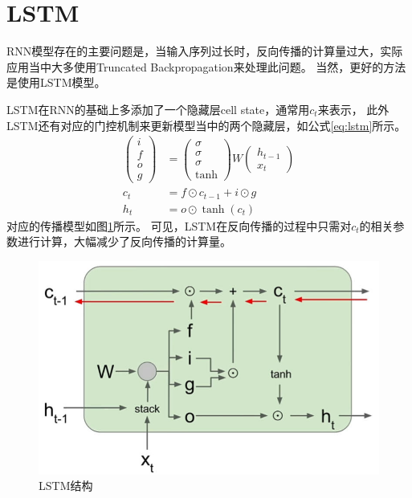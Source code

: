 \section{LSTM}
    RNN模型存在的主要问题是，当输入序列过长时，反向传播的计算量过大，实际应用当中大多使用Truncated Backpropagation来处理此问题。
    当然，更好的方法是使用LSTM模型。

    LSTM在RNN的基础上多添加了一个隐藏层cell state，通常用$c_t$来表示，
    此外LSTM还有对应的门控机制来更新模型当中的两个隐藏层，如公式\ref{eq:lstm}所示。
    \begin{equation}
        \begin{aligned}
            \begin{pmatrix}
                i \\ 
                f \\ 
                o \\ 
                g
            \end{pmatrix}
            &=
            \begin{pmatrix}
                \sigma \\ 
                \sigma \\ 
                \sigma \\ 
                \tanh
            \end{pmatrix}
            W
            \begin{pmatrix}
                h_{t-1} \\
                x_t
            \end{pmatrix} \\
            c_t &= f \odot c_{t-1} + i \odot g \\
            h_t &= o \odot \tanh(c_t)
        \end{aligned}
        \label{eq:lstm}
    \end{equation}
    对应的传播模型如图\ref{fig:lstmarchitecture}所示。
    可见，LSTM在反向传播的过程中只需对$c_t$的相关参数进行计算，大幅减少了反向传播的计算量。

    \begin{figure}[H]
        \centering
        \includegraphics[width=0.4\textheight]{./figures/lstmarchitecture.jpg}
        \caption{LSTM结构}
        \label{fig:lstmarchitecture}
    \end{figure}

